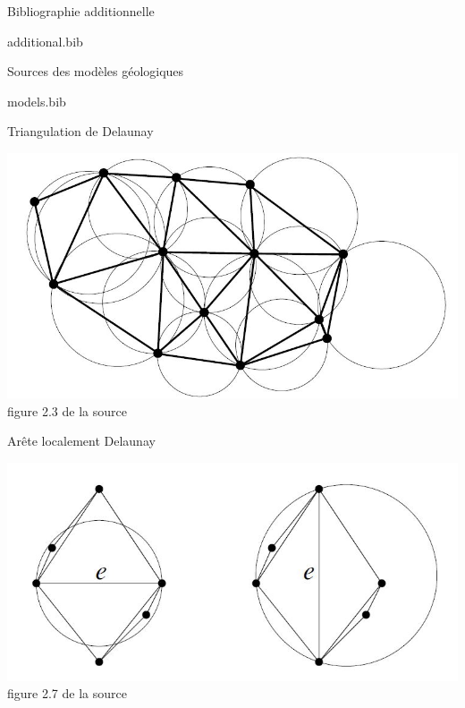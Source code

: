 \documentclass[aspectratio=169, 12pt, a4paper, hyperref={pdfauthor={Alexandre MARIN}, pdfkeywords={IFPEN, Delaunay, Voronoi, mesh generation}, colorlinks=true, linkcolor=purple, urlcolor=blue, citecolor=magenta}]{beamer}
\begin{document}
\makeByeSlide

\begin{Energie}{\small Bibliographie additionnelle}

{\tiny
\begin{btSect}{additional.bib}
\btPrintNotCited
\end{btSect}}
\end{Energie}

\begin{Energie}{\small Sources des modèles géologiques}

{\fontsize{10}{12}\selectfont
\begin{btSect}{models.bib}
\btPrintNotCited
\btPrintCited
\end{btSect}}
\end{Energie}

\begin{Energie}{Triangulation de Delaunay}
\begin{center}
\includegraphics[scale=0.55]{../pictures/delTri.jpg}
\\figure 2.3 de la source \cite{delnotes}
\end{center}
\end{Energie}


\begin{Energie}{Arête localement Delaunay}
\begin{center}
\includegraphics[scale=0.6]{locDel.jpg}
\\figure 2.7 de la source \cite{delnotes}
\end{center}
\end{Energie}
\end{document}
